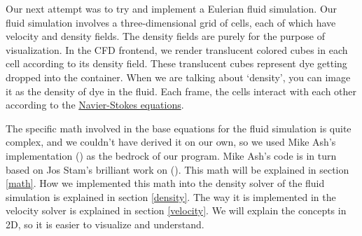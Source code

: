 \documentclass[a4paper,12pt,titlepage]{article}
\begin{document}
\noindent
\begin{minipage}[t]{0.65\textwidth}
	Our next attempt was to try and implement a Eulerian fluid simulation.
	Our fluid simulation involves a three-dimensional grid of cells, each of which
	have velocity and density fields. The density fields are purely for the purpose
	of visualization. In the CFD frontend, we render translucent colored cubes in
	each cell according to its density field. These translucent cubes represent
	dye getting dropped into the container. When we are talking about `density',
	you can image it as the density of dye in the fluid. Each frame, the cells
	interact with each other according to the \href{https://en.wikipedia.org/wiki/Navier%E2%80%93Stokes_equations}{Navier-Stokes equations}.
	\end{minipage}\hfill
	\begin{minipage}[t]{0.3\textwidth}
		\centering{}
	\end{minipage}

The specific math involved in the base equations for the fluid simulation is
quite complex, and we couldn't have derived it on our own, so we used
Mike Ash's implementation \href{www.mikeash.com/pyblog/fluid-simulation-for-dummies.html}{} (\cite{mikeash})
as the bedrock of our program. Mike Ash's code is in turn based on Jos Stam's
brilliant work on \href{www.dgp.toronto.edu/public_user/stam/reality/Research/pdf/GDC03.pdf}{} (\cite{josstam}).
This math will be explained in section \ref{math}. 
How we implemented this math into the density solver of the fluid simulation is explained in section \ref{density}.
The way it is implemented in the velocity solver is explained in section \ref{velocity}.
We will explain the concepts in 2D, so it is easier to visualize and understand. 
\end{document}
